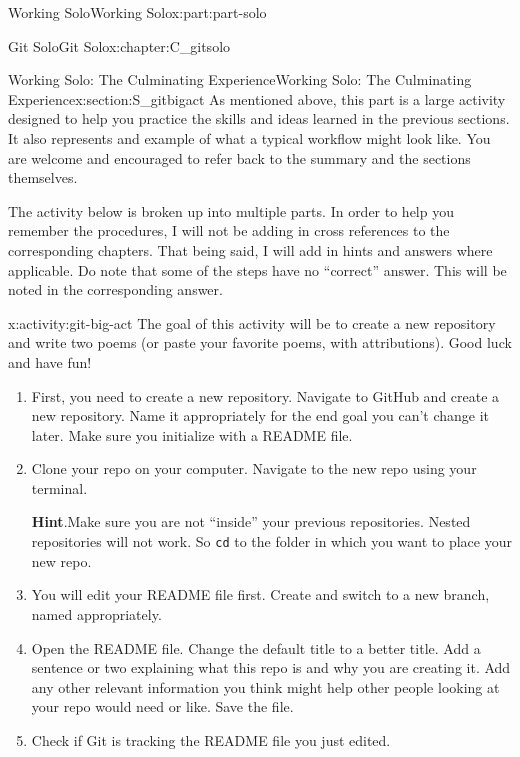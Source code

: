 \documentclass[oneside,10pt,]{book}
\newcommand{\blocktitlefont}{\relax}
\newcommand{\mono}[1]{\texttt{#1}}
\begin{document}
\begin{partptx}{Working Solo}{}{Working Solo}{}{}{x:part:part-solo}
\begin{chapterptx}{Git Solo}{}{Git Solo}{}{}{x:chapter:C_gitsolo}
\typeout{************************************************}
%
\begin{sectionptx}{Working Solo: The Culminating Experience}{}{Working Solo: The Culminating Experience}{}{}{x:section:S_gitbigact}
%
As mentioned above, this part is a large activity designed to help you practice the skills and ideas learned in the previous sections. It also represents and example of what a typical workflow might look like. You are welcome and encouraged to refer back to the summary and the sections themselves.%
\par
The activity below is broken up into multiple parts. In order to help you remember the procedures, I will not be adding in cross references to the corresponding chapters. That being said, I will add in hints and answers where applicable. Do note that some of the steps have no ``correct'' answer. This will be noted in the corresponding answer.%
\begin{activity}{}{x:activity:git-big-act}%
The goal of this activity will be to create a new repository and write two poems (or paste your favorite poems, with attributions). Good luck and have fun!%
\begin{enumerate}[font=\bfseries,label=(\alph*),ref=\alph*]
\item\label{x:task:git-ba-newrepo}First, you need to create a new repository. Navigate to GitHub and create a new repository. Name it appropriately for the end goal \textemdash{} you can't change it later. Make sure you initialize with a README file.%
\item\label{x:task:git-ba-clone}Clone your repo on your computer. Navigate to the new repo using your terminal.%
\par\smallskip%
\noindent\textbf{\blocktitlefont Hint}.\hypertarget{g:hint:idp616535480}{}\quad{}Make sure you are not ``inside'' your previous repositories. Nested repositories will not work. So \mono{cd} to the folder in which you want to place your new repo.%
\item{}You will edit your README file first. Create and switch to a new branch, named appropriately.%
\item{}Open the README file. Change the default title to a better title. Add a sentence or two explaining what this repo is and why you are creating it. Add any other relevant information you think might help other people looking at your repo would need or like. Save the file.%
\item{}Check if Git is tracking the README file you just edited.%

\end{enumerate}
\end{activity}
\end{sectionptx}
\end{chapterptx}
\end{partptx}
\end{document}
